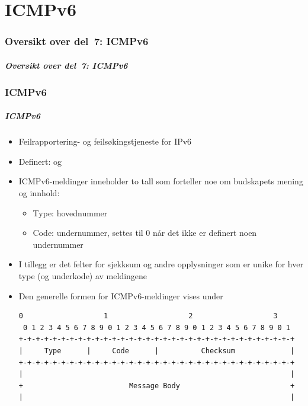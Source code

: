 \part{ICMPv6}

\begin{frame}
  \partpage
\end{frame}

\section*{Oversikt over del~7: ICMPv6}
\begin{frame}[allowframebreaks]
  \frametitle{Oversikt over del~7: ICMPv6}
    \tableofcontents%
\end{frame}

\section{ICMPv6}
\begin{frame}[fragile]%
  \frametitle{ICMPv6}
  \pause
  \begin{itemize}[<+->]
  \item Feilrapportering- og feilsøkingstjeneste for IPv6
  \item Definert:  og 
  \item ICMPv6-meldinger inneholder to tall som forteller noe om
    budskapets mening og innhold:
    \begin{itemize}[<+->]
    \item Type: hovednummer
    \item Code: undernummer, settes til 0 når det ikke er definert
      noen undernummer
    \end{itemize}
  \item I tillegg er det felter for sjekksum og andre opplysninger som
    er unike for hver type (og underkode) av meldingene
  \item Den generelle formen for ICMPv6-meldinger vises under
\begin{Verbatim}[fontsize=\tiny]
 0                   1                   2                   3
 0 1 2 3 4 5 6 7 8 9 0 1 2 3 4 5 6 7 8 9 0 1 2 3 4 5 6 7 8 9 0 1
+-+-+-+-+-+-+-+-+-+-+-+-+-+-+-+-+-+-+-+-+-+-+-+-+-+-+-+-+-+-+-+-+
|     Type      |     Code      |          Checksum             |
+-+-+-+-+-+-+-+-+-+-+-+-+-+-+-+-+-+-+-+-+-+-+-+-+-+-+-+-+-+-+-+-+
|                                                               |
+                         Message Body                          +
|                                                               |
\end{Verbatim}
  \end{itemize}
\end{frame}

